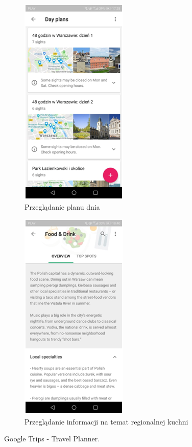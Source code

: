 \documentclass[10pt,twoside,a4paper]{report}
\begin{document}
\begin{figure}[h]
\begin{subfigure}{0.5\textwidth}
\centering
\includegraphics[width=0.9\linewidth, width=5cm]{googletrips3}
\caption{Przeglądanie planu dnia}
\label{fig:GTsubim3}
\end{subfigure}
\begin{subfigure}{0.5\textwidth}
\centering
\includegraphics[width=0.9\linewidth, width=5cm]{googletrips4}
\caption{Przeglądanie informacji na temat regionalnej kuchni}
\label{fig:GTsubim4}
\end{subfigure}
\caption{Google Trips - Travel Planner.}
\label{fig:GTimage2}
\end{figure}
\end{document}
